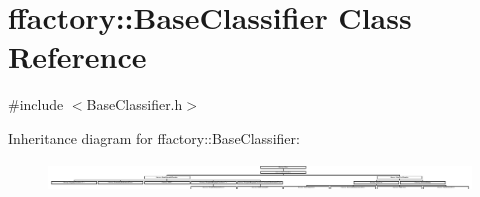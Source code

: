 \hypertarget{classffactory_1_1_base_classifier}{\section{ffactory\-:\-:Base\-Classifier Class Reference}
\label{classffactory_1_1_base_classifier}
}


{\ttfamily \#include $<$Base\-Classifier.\-h$>$}

Inheritance diagram for ffactory\-:\-:Base\-Classifier\-:\begin{figure}[H]
\begin{center}
\leavevmode
\includegraphics[height=0.789622cm]{classffactory_1_1_base_classifier}
\end{center}
\end{figure}
